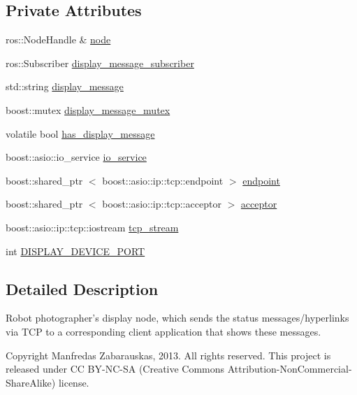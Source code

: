 \subsection*{\-Private \-Attributes}
\begin{DoxyCompactItemize}
\item 
ros\-::\-Node\-Handle \& \hyperlink{class_r_p_display_node_ad6d8ebb35b06877b8fffe1a99f556c13}{node}
\item 
ros\-::\-Subscriber \hyperlink{class_r_p_display_node_a06fa613f49e68df3feb0a32aea5a6772}{display\-\_\-message\-\_\-subscriber}
\item 
std\-::string \hyperlink{class_r_p_display_node_a67384dfa9a2bd68ef5e472fa3bec9d67}{display\-\_\-message}
\item 
boost\-::mutex \hyperlink{class_r_p_display_node_a40cb006b8813082cce33e9b39fe06bd5}{display\-\_\-message\-\_\-mutex}
\item 
volatile bool \hyperlink{class_r_p_display_node_abc112853a66daeeb45152d29772a8679}{has\-\_\-display\-\_\-message}
\item 
boost\-::asio\-::io\-\_\-service \hyperlink{class_r_p_display_node_a4ab5252d168833e5e957ed6fe09b9ebb}{io\-\_\-service}
\item 
boost\-::shared\-\_\-ptr\*
$<$ boost\-::asio\-::ip\-::tcp\-::endpoint $>$ \hyperlink{class_r_p_display_node_a80dac975875a0312b0f813acce43ff0b}{endpoint}
\item 
boost\-::shared\-\_\-ptr\*
$<$ boost\-::asio\-::ip\-::tcp\-::acceptor $>$ \hyperlink{class_r_p_display_node_a644df4995d76298e4f237c5a62874ea5}{acceptor}
\item 
boost\-::asio\-::ip\-::tcp\-::iostream \hyperlink{class_r_p_display_node_ab6617bd56195bb1408852121de2cb838}{tcp\-\_\-stream}
\item 
int \hyperlink{class_r_p_display_node_a09114efa9723f29cee2b734c8ba2ec5e}{\-D\-I\-S\-P\-L\-A\-Y\-\_\-\-D\-E\-V\-I\-C\-E\-\_\-\-P\-O\-R\-T}
\end{DoxyCompactItemize}


\subsection{\-Detailed \-Description}
\-Robot photographer's display node, which sends the status messages/hyperlinks via \-T\-C\-P to a corresponding client application that shows these messages. 

\begin{DoxyCopyright}{\-Copyright}
\-Manfredas \-Zabarauskas, 2013. \-All rights reserved. \-This project is released under \-C\-C \-B\-Y-\/\-N\-C-\/\-S\-A (\-Creative \-Commons \-Attribution-\/\-Non\-Commercial-\/\-Share\-Alike) license. 
\end{DoxyCopyright}


